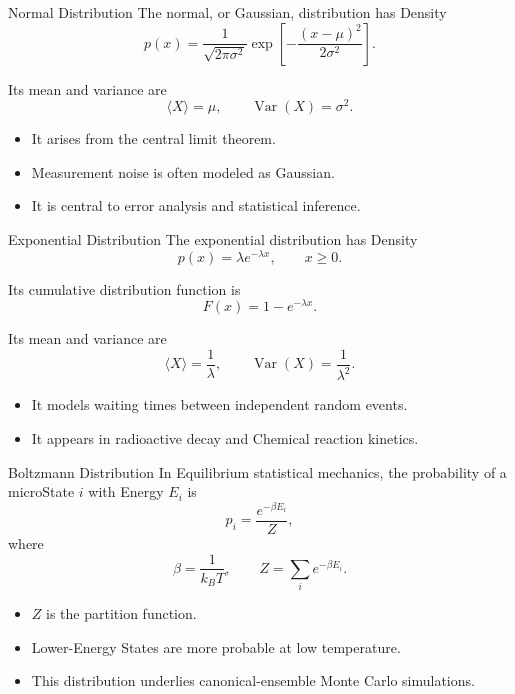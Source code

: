 \documentclass[a4paper, 10pt, onepage]{elegantbook}
\begin{document}
{\begin{frame}{Normal Distribution}
  The normal, or Gaussian, distribution has Density
  \[
    p(x)
    =
    \frac{1}{\sqrt{2\pi\sigma^2}}
    \exp\left[
      -\frac{(x-\mu)^2}{2\sigma^2}
    \right].
  \]

  Its mean and variance are
  \[
    \langle X\rangle=\mu,
    \qquad
    \operatorname{Var}(X)=\sigma^2.
  \]

  \begin{itemize}
    \item It arises from the central limit theorem.
    \item Measurement noise is often modeled as Gaussian.
    \item It is central to error analysis and statistical inference.
  \end{itemize}
\end{frame}

\begin{frame}{Exponential Distribution}
  The exponential distribution has Density
  \[
    p(x)=\lambda e^{-\lambda x},
    \qquad x\ge0.
  \]

  Its cumulative distribution function is
  \[
    F(x)=1-e^{-\lambda x}.
  \]

  Its mean and variance are
  \[
    \langle X\rangle=\frac{1}{\lambda},
    \qquad
    \operatorname{Var}(X)=\frac{1}{\lambda^2}.
  \]

  \begin{itemize}
    \item It models waiting times between independent random events.
    \item It appears in radioactive decay and Chemical reaction kinetics.
  \end{itemize}
\end{frame}

\begin{frame}{Boltzmann Distribution}
  In Equilibrium statistical mechanics, the probability of a microState \(i\) with Energy \(E_i\) is
  \[
    p_i
    =
    \frac{e^{-\beta E_i}}{Z},
  \]
  where
  \[
    \beta=\frac{1}{k_BT},
    \qquad
    Z=\sum_i e^{-\beta E_i}.
  \]

  \begin{itemize}
    \item \(Z\) is the partition function.
    \item Lower-Energy States are more probable at low temperature.
    \item This distribution underlies canonical-ensemble Monte Carlo simulations.
  \end{itemize}
\end{frame}

}
\end{document}
